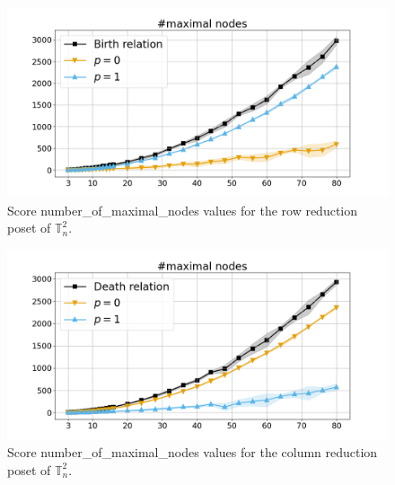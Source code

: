 \documentclass{article}
\begin{document}
    \begin{figure}[h!]
        \centering
        \hspace*{-0.24\textwidth}
        \includegraphics[width=1.4\textwidth]{pics/extended torus scores/score=number-of-maximal-nodes, dim=2, object=row reduction.png}
        \caption{Score number\_of\_maximal\_nodes values for the row reduction poset of $\mathbb{T}_n^{2}$.}
        \label{fig:numberofmaximalnodes-rowreduction2}
    \end{figure}
    \begin{figure}[h!]
        \centering
        \hspace*{-0.24\textwidth}
        \includegraphics[width=1.4\textwidth]{pics/extended torus scores/score=number-of-maximal-nodes, dim=2, object=column reduction.png}
        \caption{Score number\_of\_maximal\_nodes values for the column reduction poset of $\mathbb{T}_n^{2}$.}
        \label{fig:numberofmaximalnodes-columnreduction2}
    \end{figure}
\end{document}
